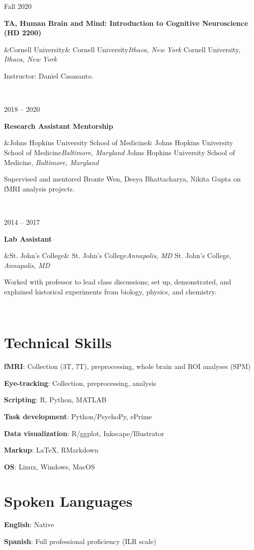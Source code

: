 \documentclass{article}
\newcommand{\entry}[5]{

  \begin{minipage}[t]{.15\textwidth}
    \begin{flushright}
      \hfill {#1}
    \end{flushright}
  \end{minipage}
  \hfill\vline\hfill
  \begin{minipage}[t]{.80\textwidth}
    \textbf{#2}

    \ifx&#3&
      {#3}\textit{#4}
    \else
      {#3, }\textit{#4}

    \fi
    \footnotesize{#5}
  \end{minipage}\\\vspace{.25cm}
}
\newcommand{\skillentry}[2]{
  {\hspace{2em}\textbf{#1}:}
  {#2}
  \vspace{.25cm}
}
\newcommand{\cu}{Cornell University}
\newcommand{\sjc}{St. John's College}
\newcommand{\jhusom}{Johns Hopkins University School of Medicine}
\begin{document}
\entry{Fall 2020}{TA, Human Brain and Mind: Introduction to Cognitive Neuroscience (HD 2200)}
{\cu}{Ithaca, New York}
{Instructor: Daniel Casasanto.}

\entry{2018 -- 2020}{Research Assistant Mentorship}
{\jhusom}{Baltimore, Maryland}
{Supervised and mentored Bronte Wen, Deeya Bhattacharya, Nikita Gupta on fMRI analysis projects.}

\entry
{2014 -- 2017}
{Lab Assistant}
{\sjc}{Annapolis, MD}
{Worked with professor to lead class discussions; set up, demonstrated, and explained historical experiments from biology, physics, and chemistry.}


\section{Technical Skills}

\skillentry{fMRI}
{Collection (3T, 7T), preprocessing, whole brain and ROI analyses (SPM)}

\skillentry{Eye-tracking}{Collection, preprocessing, analysis}

\skillentry{Scripting}{R, Python, MATLAB}

\skillentry{Task development}
{Python/PsychoPy, ePrime}

\skillentry{Data visualization}{R/ggplot, Inkscape/Illustrator}

\skillentry{Markup}{\LaTeX, RMarkdown}

\skillentry{OS}{Linux, Windows, MacOS}

\section{Spoken Languages}
\skillentry{English}{Native}

\skillentry{Spanish}{Full professional proficiency (ILR scale)}
\end{document}
